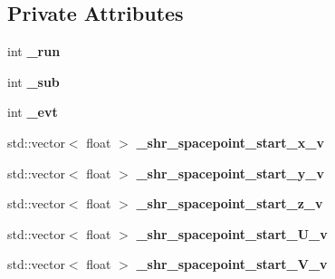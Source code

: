 \subsection*{Private Attributes}
\begin{DoxyCompactItemize}
\item 
int {\bfseries \+\_\+run}\hypertarget{classanalysis_1_1ShowerStartPoint_a707bca39c03ea4b21bbf3cacc9646798}{}\label{classanalysis_1_1ShowerStartPoint_a707bca39c03ea4b21bbf3cacc9646798}

\item 
int {\bfseries \+\_\+sub}\hypertarget{classanalysis_1_1ShowerStartPoint_a28307cb558bdb7c40def4c05fc518b05}{}\label{classanalysis_1_1ShowerStartPoint_a28307cb558bdb7c40def4c05fc518b05}

\item 
int {\bfseries \+\_\+evt}\hypertarget{classanalysis_1_1ShowerStartPoint_ab1865653c83e67efa706640f3dad72c5}{}\label{classanalysis_1_1ShowerStartPoint_ab1865653c83e67efa706640f3dad72c5}

\item 
std\+::vector$<$ float $>$ {\bfseries \+\_\+shr\+\_\+spacepoint\+\_\+start\+\_\+x\+\_\+v}\hypertarget{classanalysis_1_1ShowerStartPoint_ab1a5f63745829c06c4ee7a30db99b47b}{}\label{classanalysis_1_1ShowerStartPoint_ab1a5f63745829c06c4ee7a30db99b47b}

\item 
std\+::vector$<$ float $>$ {\bfseries \+\_\+shr\+\_\+spacepoint\+\_\+start\+\_\+y\+\_\+v}\hypertarget{classanalysis_1_1ShowerStartPoint_a9284ff719c659b758bfb91b18ddbd72c}{}\label{classanalysis_1_1ShowerStartPoint_a9284ff719c659b758bfb91b18ddbd72c}

\item 
std\+::vector$<$ float $>$ {\bfseries \+\_\+shr\+\_\+spacepoint\+\_\+start\+\_\+z\+\_\+v}\hypertarget{classanalysis_1_1ShowerStartPoint_a07a6b32d99fc862660a9bcfc735f71e1}{}\label{classanalysis_1_1ShowerStartPoint_a07a6b32d99fc862660a9bcfc735f71e1}

\item 
std\+::vector$<$ float $>$ {\bfseries \+\_\+shr\+\_\+spacepoint\+\_\+start\+\_\+\+U\+\_\+v}\hypertarget{classanalysis_1_1ShowerStartPoint_ae4900f655cd3af95549d5063c662c8f6}{}\label{classanalysis_1_1ShowerStartPoint_ae4900f655cd3af95549d5063c662c8f6}

\item 
std\+::vector$<$ float $>$ {\bfseries \+\_\+shr\+\_\+spacepoint\+\_\+start\+\_\+\+V\+\_\+v}\hypertarget{classanalysis_1_1ShowerStartPoint_af1f9e524dd586a6a460c1b215f21165a}{}\label{classanalysis_1_1ShowerStartPoint_af1f9e524dd586a6a460c1b215f21165a}


\end{DoxyCompactItemize}
